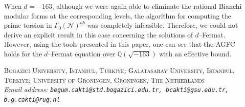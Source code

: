 \documentclass[]{article}
\newcommand {\QQ}{{\mathbb{Q}}}
\begin{document}
When $d=-163$, although we were again able to eliminate the rational Bianchi modular forms at the corresponding levels, the algorithm for computing the prime torsion in $\Gamma_0(\mathcal{N})^{a b}$ was completely infeasible. Therefore, we could not derive an explicit result in this case concerning the solutions of $d$--Fermat. However, using the tools presented in this paper, one can see that the AGFC holds for the $d$--Fermat equation over $\QQ(\sqrt{-163})$ with an effective bound.




\vspace{0.5cm}
\noindent
\textsc{Bogazici University, Istanbul, Turkiye; Galatasaray University, Istanbul, Turkiye; University of Groningen, Groningen, The Netherlands } \\
\emph{Email address: \texttt{begum.cakti@std.bogazici.edu.tr, bcakti@gsu.edu.tr, b.g.cakti@rug.nl}}
\end{document}

